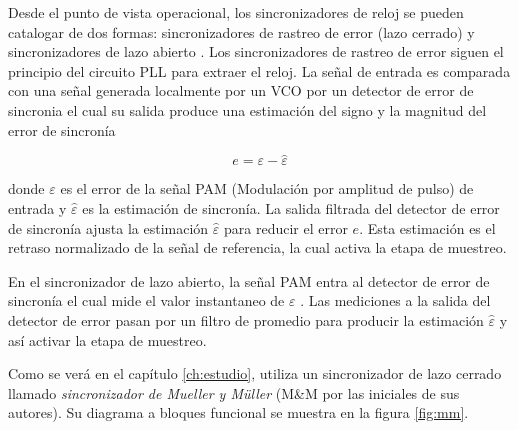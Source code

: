 Desde el punto de vista operacional, los sincronizadores de reloj se pueden catalogar de dos formas: sincronizadores de rastreo de
error (lazo cerrado) y sincronizadores de lazo abierto \cite{meyr}. Los sincronizadores de rastreo de error siguen el principio
del circuito PLL para extraer el reloj. La se\~nal de entrada es comparada con una se\~nal generada localmente por un VCO por un detector de
error de sincronia el cual su salida produce una estimaci\'on del signo y la magnitud del error de sincron\'ia

\begin{equation}
e = \varepsilon - \hat{\varepsilon}
\end{equation}

donde $\varepsilon$ es el error de la se\~nal PAM (Modulaci\'on por amplitud de pulso) de entrada y $\hat{\varepsilon}$ es la
estimaci\'on de sincron\'ia. La salida filtrada del detector de error de sincron\'ia ajusta la estimaci\'on $\hat{\varepsilon}$
para reducir el error $e$. Esta estimaci\'on es el retraso normalizado de la se\~nal de referencia, la cual activa la etapa de muestreo.

En el sincronizador de lazo abierto, la se\~nal PAM entra al detector de error de sincron\'ia el cual mide el valor instantaneo de
$\varepsilon$ \cite{meyr}. Las mediciones a la salida del detector de error pasan por un filtro de promedio para producir la
estimaci\'on $\hat{\varepsilon}$ y as\'i activar la etapa de muestreo.

Como se ver\'a en el cap\'itulo \ref{ch:estudio}, \gnuradio utiliza un sincronizador de lazo cerrado llamado \emph{sincronizador
de Mueller y M\"uller} (M\&M por las iniciales de sus autores). Su diagrama a bloques funcional se muestra en la figura \ref{fig:mm}.

